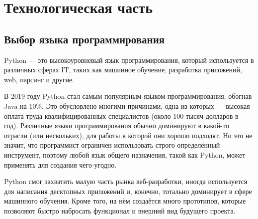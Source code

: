 \documentclass[a4paper]{article}
\begin{document}
	
	
	\clearpage
	
	\section{Технологическая часть}
	\subsection{Выбор языка программирования}
	Python — это высокоуровневый язык программирования, который используется в различных сферах IT, таких как машинное обучение, разработка приложений, web, парсинг и другие.
	
	В 2019 году Python стал самым популярным языком программирования, обогнав Java на 10\%. Это обусловлено многими причинами, одна из которых — высокая оплата труда квалифицированных специалистов (около 100 тысяч долларов в год).
	Различные языки программирования обычно доминируют в какой-то отрасли (или нескольких), для работы в которой они хорошо подходят. Но это не значит, что программист ограничен использовать строго определённый инструмент, поэтому любой язык общего назначения, такой как Python, может применять для создания чего-угодно.
	
	Python смог захватить малую часть рынка веб-разработки, иногда используется для написания десктопных приложений и, конечно, тотально доминирует в сфере машинного обучения. Кроме того, на нём создаётся много прототипов, которые позволяют быстро набросать функционал и внешний вид будущего проекта.
	
\end{document}
